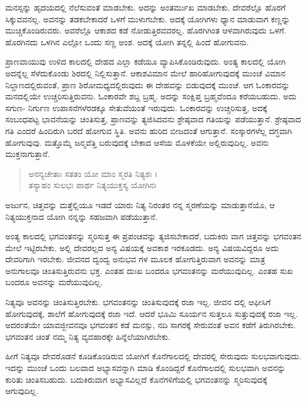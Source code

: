 ಮನಸ್ಸನ್ನು ಹೃದಯದಲ್ಲಿ ನೆಲೆಸುವಂತೆ ಮಾಡಬೇಕು. ಅದನ್ನು ಅಂತರ್ಮುಖ ಮಾಡಬೇಕು. ದೇವರೆಲ್ಲೊ ಹೊರಗೆ ಸಿಕ್ಕುವವನಲ್ಲ. ಅವನನ್ನು ತಡಕಬೇಕಾದರೆ ಒಳಗೆ ಮುಳುಗಬೇಕು. ಅದಕ್ಕೆ ಯೋಗಿಗಳು ಧ್ಯಾನ ಮಾಡುವಾಗ ಕಣ್ಣನ್ನು ಮುಚ್ಚಿಕೊಂಡಿರುವರು. ಅವರೆಲ್ಲೊ ಆಕಾಶದ ಕಡೆ ನೋಡುತ್ತಿರವವರಲ್ಲ. ಹೊರಗಿಗಿಂತ ಆಳವಾಗಿರುವುದು ಒಳಗೆ. ಹೊರಗಿನದು ಒಳಗಿನ ಎಲ್ಲೋ ಒಂದು ಸಣ್ಣ ಅಂಶ. ಅದಕ್ಕೆ ಯೋಗಿ ತನ್ನಲ್ಲಿ ಹಿಂದೆ ಹೋಗುವನು.

ಪ್ರಾಣವಾಯುವು ಉಳಿದ ಕಾಲದಲ್ಲಿ ದೇಹದ ಎಲ್ಲಾ ಕಡೆಯೂ ವ್ಯಾಪಿಸಿಕೊಂಡಿರುವುದು. ಅಂತ್ಯ ಕಾಲದಲ್ಲಿ ಯೋಗಿ ಅದನ್ನೆಲ್ಲ ಸೆಳೆದುಕೊಂಡು ಶಿರದಲ್ಲಿ ನಿಲ್ಲಿಸುತ್ತಾನೆ. ಆಕಾಶವಿಮಾನ ಮೇಲೆ ಹಾರಿಹೋಗುವುದಕ್ಕೆ ಮುಂಚೆ ವಿಮಾನ ನಿಲ್ದಾಣದಲ್ಲಿರುವಂತೆ, ಪ್ರಾಣ ಶಿರೋಮಧ್ಯದಲ್ಲಿರುವುದು ಈ ದೇಹವನ್ನು ಬಿಡುವುದಕ್ಕೆ ಮುಂಚೆ. ಆಗ ಓಂಕಾರವನ್ನು ಮನದಲ್ಲಿಯೇ ಉಚ್ಚರಿಸುತ್ತಿರುವನು. ಓಂಕಾರವೇ ಶಬ್ದ ಬ್ರಹ್ಮ. ಅದನ್ನು ಸಂಕ್ಷಿಪ್ತ ಬ್ರಹ್ಮವೆಂದೂ ಕರೆಯಬಹುದು. ಅದು ಸಗುಣ- ನಿರ್ಗುಣ ಉಪಾಸನೆಗಳೆರಡಕ್ಕೂ ಸೇತುವೆಯಂತೆ ಇರುವುದು. ಓಂಕಾರವನ್ನು ಉಚ್ಚರಿಸುತ್ತ, ಅದಕ್ಕೆ ಸಂಬಂಧಪಟ್ಟ ಭಾವನೆಯನ್ನು ಚಿಂತಿಸುತ್ತ, ಪ್ರಾಣವನ್ನು ತ್ಯಜಿಸಿದವನು ಶ್ರೇಷ್ಠವಾದ ಗತಿಯನ್ನು ಪಡೆಯುತ್ತಾನೆ. ಶ್ರೇಷ್ಠವಾದ ಗತಿ ಎಂದರೆ ಹಿಂದಿರುಗಿ ಬರದೆ ಹೋಗುವ ಸ್ಥಿತಿ. ಅವನು ಹುರಿದ ಬೀಜದಂತೆ ಆಗುತ್ತಾನೆ. ಸಂಸ್ಕಾರಗಳೆಲ್ಲ ದಗ್ಧವಾಗಿ ಹೋಗುವುವು. ಮತ್ತೊಮ್ಮೆ ಜನ್ಮವೆತ್ತಿ ಬರುವುದಕ್ಕೆ ಬೇಕಾದ ಆಸೆಯ ಮೊಳಕೆಯೇ ಅಲ್ಲಿರುವುದಿಲ್ಲ. ಅವನು ಮುಕ್ತನಾಗುತ್ತಾನೆ.

\begin{verse}
ಅನನ್ಯಚೇತಾಃ ಸತತಂ ಯೋ ಮಾಂ ಸ್ಮರತಿ ನಿತ್ಯಶಃ ।\\ತಸ್ಯಾಹಂ ಸುಲಭಃ ಪಾರ್ಥ ನಿತ್ಯಯುಕ್ತಸ್ಯ ಯೋಗಿನಃ 
\end{verse}

{\small ಅರ್ಜುನ, ಚಿತ್ತವನ್ನು ಮತ್ತೆಲ್ಲಿಯೂ ಇಡದೆ ಯಾರು ನಿತ್ಯ ನಿರಂತರ ನನ್ನ ಸ್ಮರಣೆಯನ್ನು ಮಾಡುತ್ತಾನೆಯೊ, ಆ ನಿತ್ಯಯುಕ್ತನಾದ ಯೋಗಿ ನನ್ನನ್ನು ಸಹಜವಾಗಿ ಪಡೆಯುತ್ತಾನೆ.}

ಅಂತ್ಯ ಕಾಲದಲ್ಲಿ ಭಗವಂತನನ್ನು ಸ್ಮರಿಸುತ್ತ ಈ ಪ್ರಪಂಚವನ್ನು ತ್ಯಜಿಸಬೇಕಾದರೆ, ಬದುಕಿರು ವಾಗ ಚಿತ್ತವನ್ನು ಭಗವಂತನ ಮೇಲೆ ಇಟ್ಟಿರಬೇಕು. ಅಲ್ಲಿ ದೇವರಲ್ಲದ ಅನ್ಯ ವಿಷಯಕ್ಕೆ ಅವಕಾಶ ಇರಕೂಡದು. ಅನ್ಯ ವಿಷಯವಿದ್ದರೂ ಅದು ದೇವರಿಗಾಗಿ ಇರಬೇಕು. ಜೀವನದ ದ್ವಂದ್ವ ಅನುಭವ ಗಳ ಮೂಲಕ ಹೋಗುತ್ತಿರುವಾಗ ಅವನನ್ನು ಮಾತ್ರ ಅನುಗಾಲವೂ ಚಿಂತಿಸುತ್ತಿರುವನು ಭಕ್ತ. ಎಂತಹ ದುಃಖ ಬಂದರೂ ಭಗವಂತನನ್ನು ಮರೆಯುವುದಿಲ್ಲ. ಎಂತಹ ಸುಖ ಬಂದರೂ ಅವನನ್ನು ಮರೆಯುವುದಿಲ್ಲ.

ನಿತ್ಯವೂ ಅವನನ್ನು ಚಿಂತಿಸುತ್ತಿರಬೇಕು. ಭಗವಂತನನ್ನು ಚಿಂತಿಸುವುದಕ್ಕೆ ರಜಾ ಇಲ್ಲ. ಜೀವನ ದಲ್ಲಿ ಆಫೀಸಿಗೆ ಹೋಗುವುದಕ್ಕೆ, ಶಾಲೆಗೆ ಹೋಗುವುದಕ್ಕೆ ರಜಾ ಇದೆ. ಆದರೆ ಭೂಮಿ ಸೂರ್ಯನ ಸುತ್ತಲೂ ಸುತ್ತುವುದಕ್ಕೆ ರಜಾ ಇಲ್ಲ. ಅದರಂತೆಯೇ ಯಾವಜ್ಜೀವನವೂ ಭಗವಂತನ ಕಡೆ ಮನಸ್ಸು, ನದಿ ಸಾಗರಕ್ಕೆ ಸೇರುವಂತೆ ಅವನ ಕಡೆಗೆ ತಿರುಗಿರಬೇಕು. ಭಗವಂತನ ಚಿಂತೆ ನಮ್ಮ ನಿತ್ಯ ವ್ಯವಹಾರಕ್ಕೇ ಹಿನ್ನೆಲೆಯಾಗಿರಬೇಕು.

ಹೀಗೆ ನಿತ್ಯವೂ ದೇವರೊಡನೆ ಕೂಡಿಕೊಂಡಿರುವ ಯೋಗಿಗೆ ಕೊನೆಗಾಲದಲ್ಲಿ ದೇವರಲ್ಲಿ ಸೇರುವುದು ಸುಲಭವಾಗುವುದು. ಇದನ್ನು ಮುಂಚೆ ಒಂದು ಬಲವಾದ ಅಭ್ಯಾಸವನ್ನಾಗಿ ಮಾಡಿ ಕೊಂಡಿದ್ದರೆ ಕೊನೆಗಾಲದಲ್ಲಿ ಸುಲಭವಾಗಿ ಅವನನ್ನು ಕುರಿತು ಚಿಂತಿಸಬಹುದು. ಬದುಕಿರುವಾಗ ಅಭ್ಯಾಸವಿಲ್ಲದೆ ಕೊನೆಗಳಿಗೆಯಲ್ಲಿ ಭಗವಂತನನ್ನು ಸ್ಮರಿಸುವುದಕ್ಕೆ ಆಗುವುದಿಲ್ಲ.

